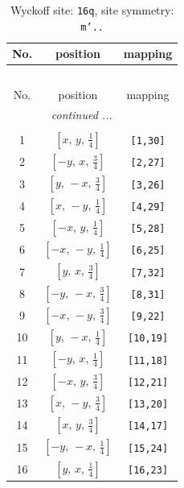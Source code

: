 \documentclass[fleqn,8pt]{jsarticle}
\begin{document}
\begin{longtable}{ccc}
\caption{Wyckoff site: {\tt 16q}, site symmetry: {\tt m'..}}
 \\
 \hline \hline
No. & position & mapping \\ \hline \endfirsthead

\multicolumn{2}{l}{\tablename\ \thetable{}} \\
 \hline \hline
No. & position & mapping \\ \hline \endhead

 \hline \hline
\multicolumn{2}{r}{\footnotesize\it continued ...} \\ \endfoot

 \hline \hline
\multicolumn{2}{r}{} \\ \endlastfoot

1 & $\left[ x,\, y,\, \frac{1}{4} \right]$ & {\tt [1,30]} \\ \hline
2 & $\left[ - y,\, x,\, \frac{3}{4} \right]$ & {\tt [2,27]} \\ \hline
3 & $\left[ y,\, - x,\, \frac{3}{4} \right]$ & {\tt [3,26]} \\ \hline
4 & $\left[ x,\, - y,\, \frac{1}{4} \right]$ & {\tt [4,29]} \\ \hline
5 & $\left[ - x,\, y,\, \frac{1}{4} \right]$ & {\tt [5,28]} \\ \hline
6 & $\left[ - x,\, - y,\, \frac{1}{4} \right]$ & {\tt [6,25]} \\ \hline
7 & $\left[ y,\, x,\, \frac{3}{4} \right]$ & {\tt [7,32]} \\ \hline
8 & $\left[ - y,\, - x,\, \frac{3}{4} \right]$ & {\tt [8,31]} \\ \hline
9 & $\left[ - x,\, - y,\, \frac{3}{4} \right]$ & {\tt [9,22]} \\ \hline
10 & $\left[ y,\, - x,\, \frac{1}{4} \right]$ & {\tt [10,19]} \\ \hline
11 & $\left[ - y,\, x,\, \frac{1}{4} \right]$ & {\tt [11,18]} \\ \hline
12 & $\left[ - x,\, y,\, \frac{3}{4} \right]$ & {\tt [12,21]} \\ \hline
13 & $\left[ x,\, - y,\, \frac{3}{4} \right]$ & {\tt [13,20]} \\ \hline
14 & $\left[ x,\, y,\, \frac{3}{4} \right]$ & {\tt [14,17]} \\ \hline
15 & $\left[ - y,\, - x,\, \frac{1}{4} \right]$ & {\tt [15,24]} \\ \hline
16 & $\left[ y,\, x,\, \frac{1}{4} \right]$ & {\tt [16,23]} \\
\end{longtable}
\end{document}
